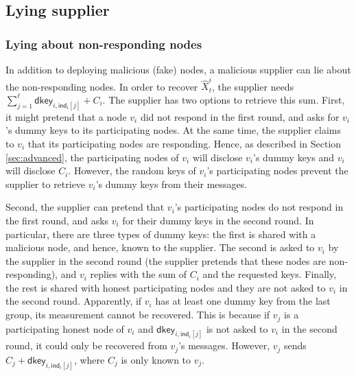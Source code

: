 \documentclass[11pt,a4paper]{article}
\theoremstyle{plain}
\theoremstyle{plain}
\theoremstyle{plain}
\theoremstyle{plain}
\theoremstyle{nonumberplain} \theoremseparator{}
\begin{document}
\subsection{Lying supplier}


\subsubsection*{Lying about non-responding nodes}

In addition to deploying malicious (fake) nodes, a malicious supplier can
lie about the non-responding nodes. 
In order to recover $\hat{X}_{t}^{i}$, the supplier needs $\sum^\ell_{j=1} \mathsf{dkey}_{i,\mathsf{ind}_i[j]} + C_{i}$. The supplier has two options to retrieve this sum.
First, it might pretend that a node $v_i$ did not respond in the first round,
and asks for $v_i$'s dummy keys to its participating nodes. At the same time, the supplier claims to $v_i$ that
its participating nodes are responding. 
Hence, as described in Section \ref{sec:advanced}, the participating nodes of $v_i$ will disclose $v_i$'s
dummy keys and $v_i$ will disclose $C_i$. However, the random keys of $v_i$'s participating nodes prevent the supplier to retrieve $v_i$'s dummy keys from their messages. 

Second, the supplier can pretend that $v_i$'s participating nodes do not respond in the first round,
and asks $v_i$ for their dummy keys in the second round. 
In particular, there are three types of dummy keys: the first is shared with a malicious node, and hence, known to the supplier. The second is asked to $v_i$ by the supplier in the second round (the supplier pretends that these nodes are non-responding), and $v_i$ replies with the sum of $C_i$ and the requested keys. Finally, the rest is shared with honest participating nodes and they are not asked to $v_i$ in the second round. Apparently, if $v_i$ has at least one dummy key from the last group, its measurement cannot be recovered. This is because if $v_j$ is a participating honest node of $v_i$ and $\mathsf{dkey}_{i,\mathsf{ind}_i[j]}$ is not asked to $v_i$ in the second round, it could only be recovered from $v_j$'s messages. However, $v_j$ sends $C_{j} + \mathsf{dkey}_{i,\mathsf{ind}_i[j]}$, where $C_j$ is only known to $v_j$.    
 
\end{document}
